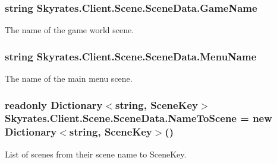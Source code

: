 \hypertarget{class_skyrates_1_1_client_1_1_scene_1_1_scene_data_a48d1b49f072d6c1962ef98e479018d4d}{
\subsubsection[{Game\-Name}]{\setlength{\rightskip}{0pt plus 5cm}string Skyrates.\-Client.\-Scene.\-Scene\-Data.\-Game\-Name}}\label{class_skyrates_1_1_client_1_1_scene_1_1_scene_data_a48d1b49f072d6c1962ef98e479018d4d}


The name of the game world scene. 

\hypertarget{class_skyrates_1_1_client_1_1_scene_1_1_scene_data_a4dca2dede679e6f2a2d59f76f2a1f1b6}{
\subsubsection[{Menu\-Name}]{\setlength{\rightskip}{0pt plus 5cm}string Skyrates.\-Client.\-Scene.\-Scene\-Data.\-Menu\-Name}}\label{class_skyrates_1_1_client_1_1_scene_1_1_scene_data_a4dca2dede679e6f2a2d59f76f2a1f1b6}


The name of the main menu scene. 

\hypertarget{class_skyrates_1_1_client_1_1_scene_1_1_scene_data_a711010b1f45c341f1617742c94263ceb}{
\subsubsection[{Name\-To\-Scene}]{\setlength{\rightskip}{0pt plus 5cm}readonly Dictionary$<$string, {\bf Scene\-Key}$>$ Skyrates.\-Client.\-Scene.\-Scene\-Data.\-Name\-To\-Scene = new Dictionary$<$string, {\bf Scene\-Key}$>$()}}\label{class_skyrates_1_1_client_1_1_scene_1_1_scene_data_a711010b1f45c341f1617742c94263ceb}


List of scenes from their scene name to Scene\-Key. 

